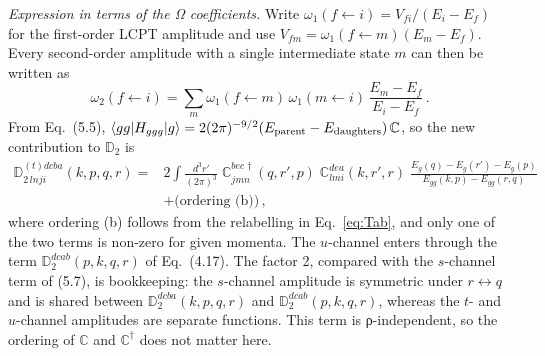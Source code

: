 \documentclass[11pt,a4paper]{article}
\newcommand{\Hggg}{H_{ggg}}
\newcommand{\eq}[1]{Eq.~(#1)}
\begin{document}
\emph{Expression in terms of the Ω coefficients.} Write $\omega_1(f\!\leftarrow\! i)=V_{fi}/(E_i-E_f)$ for the first-order LCPT amplitude and use $V_{fm}=\omega_1(f\!\leftarrow\! m)(E_m-E_f)$. Every second-order amplitude with a single intermediate state $m$ can then be written as
\begin{equation}
\omega_2(f\!\leftarrow\! i)=\sum_m \omega_1(f\!\leftarrow\! m)\,\omega_1(m\!\leftarrow\! i)\,\frac{E_m-E_f}{E_i-E_f}\,.
\label{eq:w2}
\end{equation}
From \eq{5.5}, $\langle gg|\Hggg|g\rangle=2(2\pi)^{-9/2}(E_{\rm parent}-E_{\rm daughters})\,\mathbb C$, so the new contribution to $\mathbb D_2$ is
\begin{align}
\mathbb D^{(t)dcba}_{2\,lnji}(k,p,q,r)={}&2\int\!\frac{d^3r'}{(2\pi)^3}\;\mathbb C^{bec\dagger}_{jmn}(q,r',p)\;\mathbb C^{dea}_{lmi}(k,r',r)\;
\frac{E_g(q)-E_g(r')-E_g(p)}{E_{gg}(k,p)-E_{gg}(r,q)}\nonumber\\
&+\text{(ordering (b))}\,,
\label{eq:D2t}
\end{align}
where ordering (b) follows from the relabelling in Eq.~\eqref{eq:Tab}, and only one of the two terms is non-zero for given momenta. The $u$-channel enters through the term $\mathbb D_2^{dcab}(p,k,q,r)$ of \eq{4.17}. The factor 2, compared with the $s$-channel term of (5.7), is bookkeeping: the $s$-channel amplitude is symmetric under $r\leftrightarrow q$ and is shared between $\mathbb D_2^{dcba}(k,p,q,r)$ and $\mathbb D_2^{dcab}(p,k,q,r)$, whereas the $t$- and $u$-channel amplitudes are separate functions. This term is ρ-independent, so the ordering of $\mathbb C$ and $\mathbb C^\dagger$ does not matter here.
\end{document}
